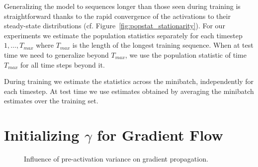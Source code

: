 \documentclass{article} %
\begin{document}
Generalizing the model to sequences longer than those seen during training
is straightforward thanks to the rapid convergence of the activations
to their steady-state distributions (cf. Figure~\ref{fig:popstat_stationarity}).
For our experiments we estimate the population statistics separately for each timestep $1, \ldots, T_{max}$ where $T_{max}$ is the length of the longest training sequence.
When at test time we need to generalize beyond $T_{max}$, we use the population statistic of time $T_{max}$ for all time steps beyond it.

During training we estimate the statistics across the minibatch, independently for each timestep.
At test time we use estimates obtained by averaging the minibatch estimates over the training set.




\section{Initializing $\gamma$ for Gradient Flow}
\label{sec:activation-variance}

\begin{figure}[!ht]
  \center%
  \hspace{2mm}%
  \caption{
Influence of pre-activation variance on gradient propagation.
}
  \label{fig:variance}
\end{figure}
\end{document}
